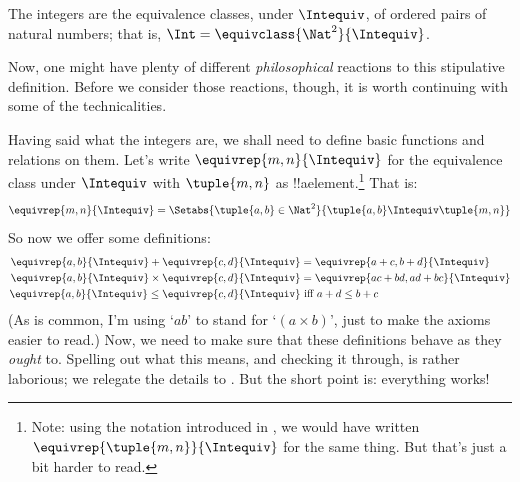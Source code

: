 \documentclass[../../../include/open-logic-section]{subfiles}
\begin{document}
\begin{defn}
		The integers are the equivalence classes, under $\Intequiv$, of  ordered pairs of natural numbers; that is, $\Int = \equivclass{\Nat^2}{\Intequiv}$.
\end{defn}

Now, one might have plenty of different \emph{philosophical} reactions to this stipulative definition. Before we consider those reactions, though, it is worth continuing with some of the technicalities. 

Having said what the integers are, we shall need to define basic functions and relations on them. Let's write $\equivrep{m, n}{\Intequiv}$ for the equivalence class under $\Intequiv$ with $\tuple{m, n}$ as !!a{element}.\footnote{Note: using the notation introduced in , we would have written $\equivrep{\tuple{m,n}}{\Intequiv}$ for the same thing. But that's just a bit harder to read.} That is: 
	$$\equivrep{m, n}{\Intequiv} = \Setabs{\tuple{a, b} \in \Nat^2}{\tuple{a, b}\Intequiv \tuple{m, n}}$$
So now we offer some definitions:
	\begin{align*}
		\equivrep{a, b}{\Intequiv} + \equivrep{c, d}{\Intequiv} &= \equivrep{a + c, b + d}{\Intequiv}\\
		\equivrep{a, b}{\Intequiv} \times \equivrep{c, d}{\Intequiv} &= \equivrep{a c + b  d, a  d + b c}{\Intequiv}\\
		\equivrep{a, b}{\Intequiv} \leq \equivrep{c, d}{\Intequiv} &\text{ iff }a + d \leq b + c
	\end{align*}	
(As is common, I'm using `$ab$' to stand for `$(a \times b)$', just to make the axioms easier to read.) Now, we need to make sure that these definitions behave as they \emph{ought} to. Spelling out what this means, and checking it through, is rather laborious; we relegate the details to . But the short point is: everything works! 
\end{document}
